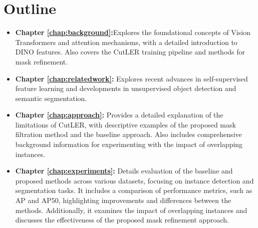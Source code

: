 \section{Outline}
\begin{itemize}
	 \item \textbf{Chapter \ref{chap:background}:}Explores the foundational concepts of Vision Transformers and attention mechanisms, with a detailed introduction to DINO features. Also covers the CutLER training pipeline and methods for mask refinement.
	 
    \item \textbf{Chapter \ref{chap:relatedwork}:} Explores recent advances in self-supervised feature learning and developments in unsupervised object detection and semantic segmentation.
    
    \item \textbf{Chapter \ref{chap:approach}:} Provides a detailed explanation of the limitations of CutLER, with descriptive examples of the proposed mask filtration method and the baseline approach. Also includes comprehensive background information for experimenting with the impact of overlapping instances.
    
    \item \textbf{Chapter \ref{chap:experiments}:} Details evaluation of the baseline and proposed methods across various datasets, focusing on instance detection and segmentation tasks. It includes a comparison of performance metrics, such as AP and AP50, highlighting improvements and differences between the methods. Additionally, it examines the impact of overlapping instances and discusses the effectiveness of the proposed mask refinement approach.
\end{itemize}
